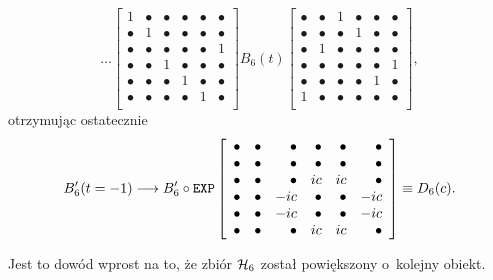 \documentclass[a4paper,12pt,twoside]{article}
\newcommand{\HADAMARDS}[1]{{\cal H}_{#1}}
\begin{document}
\begin{equation}
\dots
\left[
\begin{array}{cccccc}
      1 & \bullet & \bullet & \bullet & \bullet & \bullet\\
\bullet &       1 & \bullet & \bullet & \bullet & \bullet\\
\bullet & \bullet & \bullet & \bullet & \bullet &       1\\
\bullet & \bullet &       1 & \bullet & \bullet & \bullet\\
\bullet & \bullet & \bullet &       1 & \bullet & \bullet\\
\bullet & \bullet & \bullet & \bullet &       1 & \bullet\\
\end{array}
\right]
B_6(t)
\left[
\begin{array}{cccccc}
\bullet & \bullet &       1 & \bullet & \bullet & \bullet\\
\bullet & \bullet & \bullet &       1 & \bullet & \bullet\\
\bullet &       1 & \bullet & \bullet & \bullet & \bullet\\
\bullet & \bullet & \bullet & \bullet & \bullet &       1\\
\bullet & \bullet & \bullet & \bullet &       1 & \bullet\\
      1 & \bullet & \bullet & \bullet & \bullet & \bullet\\
\end{array}
\right],
\end{equation}
otrzymuj\k{a}c ostatecznie
\begin{equation}
B'_6(t=-1)\longrightarrow B'_6 \circ \verb"EXP"
\left[
\begin{array}{rrrrrr}
  \bullet & \bullet & \bullet & \bullet & \bullet & \bullet \\
  \bullet & \bullet & \bullet & \bullet & \bullet & \bullet \\
  \bullet & \bullet & \bullet &     i c &     i c & \bullet \\
  \bullet & \bullet & -i c & \bullet & \bullet & -i c \\
  \bullet & \bullet & -i c & \bullet & \bullet & -i c \\
  \bullet & \bullet & \bullet &  i c &  i c & \bullet \\
\end{array}
\right] \equiv D_6(c).
\end{equation}

Jest to dow\'{o}d wprost na to, \.{z}e zbi\'{o}r $\HADAMARDS{6}$ zosta{\l} powi\k{e}kszony o~kolejny obiekt.
\end{document}
